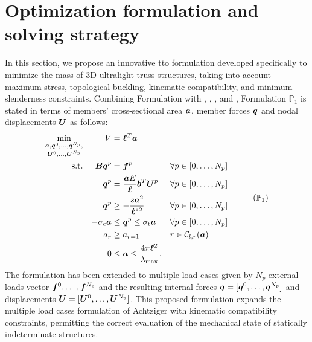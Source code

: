 \section{Optimization formulation and solving strategy} \label{sec:04_formulation_and_algo}
\label{sec:04_method}
In this section, we propose an innovative \gls{tto} formulation developed specifically to minimize the mass of 3D ultralight truss structures, taking into account maximum stress, topological buckling, kinematic compatibility, and minimum slenderness constraints. Combining Formulation  with  , , , and , Formulation $\mathbb{P}_1$ is stated in terms of members' cross-sectional area $\bm{a}$, member forces $\bm{q}$ and nodal displacements $\bm{U}$ as follows:
\begin{equation}
    \begin{aligned}
    \underset{\vect{U}^0, \dots, \vect{U}^{N_p}}{\min_{\vect{a}, \vect{q}^0, \dots, \vect{q}^{N_p},}}   && V &= \vect{\ell}^{T}\vect{a}\\
    \textrm{s.t.}   && \matr{B}\vect{q}^p &= \vect{f}^p && \forall p \in [0,\dots,N_p]\\
    && \vect{q}^p &= \frac{\vect{a}E}{\vect{\ell}}\vect{b}^T\vect{U}^p && \forall p \in [0,\dots,N_p] \\
    && \vect{q}^p &\geq -\frac{s\vect{a}^2}{\vect{\ell}^{*2}} && \forall p \in [0,\dots,N_p] \\
    && -\sigma_\text{c}\vect{a} &\leq \vect{q}^p \leq \sigma_\text{t}\vect{a} && \forall p \in [0,\dots,N_p] \\
    && a_{r}&\geq a_{r=1} && r \in \mathcal{C}_{l,r}(\vect{a}) \\
    && 0 &\leq \vect{a} \leq \frac{4 \pi \vect{\ell}^2}{\lambda_{\text{max}}}. \\
    \end{aligned}
    \tag{$\mathbb{P}_1$}
    \label{eq:04_optim_complete}
\end{equation}
The formulation has been extended to multiple load cases given by $N_p$ external loads vector $\bm{f}^0, \dots, \bm{f}^{N_p}$ and the resulting internal forces $\bm{q} = [\bm{q}^0,\dots, \bm{q}^{N_p}]$ and displacements $\bm{U} = [\bm{U}^0,\dots, \bm{U}^{N_p}]$. This proposed formulation expands the multiple load cases formulation of Achtziger  with kinematic compatibility constraints, permitting the correct evaluation of the mechanical state of statically indeterminate structures.

